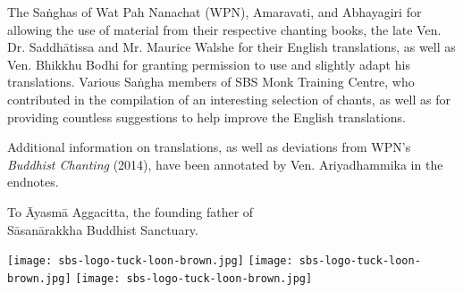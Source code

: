 
\cleartorecto
\thispagestyle{empty}

{

  \setlength{\parskip}{10pt}

   \fi
   \fi
   \fi


  The Saṅghas of Wat Pah Nanachat (WPN), Amaravati, and Abhayagiri for allowing the use of material from their respective chanting books, the late Ven. Dr. Saddhātissa and Mr. Maurice Walshe for their English translations, as well as Ven. Bhikkhu Bodhi for granting permission to use and slightly adapt his translations. Various Saṅgha members of SBS Monk Training Centre, who contributed in the compilation of an interesting selection of chants, as well as for providing countless suggestions to help improve the English translations.

  Additional information on translations, as well as deviations\makeatletter\hyperlink{endnote1-appendix}\makeatother\thickspace
  from WPN's \textit{Buddhist Chanting} (2014), have been annotated by Ven. Ariyadhammika in the endnotes.


  \ifninebythirteenversion \smallskip \else \medskip \fi

  {\centering

    To Āyasmā Aggacitta, the founding father of\\
    Sāsanārakkha Buddhist Sanctuary.

    \ifninebythirteenversion \smallskip \else \medskip \fi

    \begin{center}
      \ifafiveversion \texttt{[image: sbs-logo-tuck-loon-brown.jpg]} \fi
      \ifninebythirteenversion \texttt{[image: sbs-logo-tuck-loon-brown.jpg]}\fi
      \ifbfiveversion \texttt{[image: sbs-logo-tuck-loon-brown.jpg]}\fi
    \end{center}
  }
}

